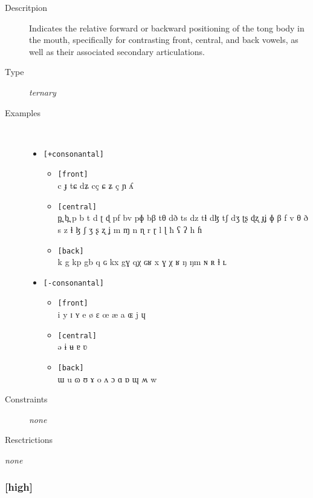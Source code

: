 \documentclass[10pt,letterpaper]{article}
\begin{document}
\begin{description}
\item[Descritpion] Indicates the relative forward or backward positioning of the tong body in the mouth, specifically for contrasting front, central, and back vowels, as well as their associated secondary articulations.
\item[Type] \emph{ternary}
\item[Examples]\
  \begin{itemize}
    \item \texttt{[+consonantal]}
    \begin{itemize}
      \item \texttt{[front]}\\
      c ɟ tɕ dʑ cç ɕ ʑ ç ɲ ʎ 
      \item \texttt{[central]}\\
      p̪ b̪ p b t d ʈ ɖ pf bv pɸ bβ tθ dð ts dz tɬ dɮ tʃ dʒ ʈʂ ɖʐ ɟʝ ɸ β f v θ ð s z ɬ ɮ ʃ ʒ ʂ ʐ ʝ m ɱ n ɳ r ɽ l ɭ ħ ʕ ʔ h ɦ 
      \item \texttt{[back]}\\
      k g kp gb q ɢ kx gɣ qχ ɢʁ x ɣ χ ʁ ŋ ŋm ɴ ʀ ɫ ʟ 
    \end{itemize}
    \item  \texttt{[-consonantal]}
    \begin{itemize}
      \item \texttt{[front]}\\
      i y ɪ ʏ e ø ɛ œ æ a ɶ j ɥ 
      \item \texttt{[central]}\\
      ə ɨ ʉ ɐ ʋ 
      \item \texttt{[back]}\\
      ɯ u ɷ ʊ ɤ o ʌ ɔ ɑ ɒ ɰ ʍ w 
    \end{itemize}
  \end{itemize}
\item[Constraints] \emph{none}
\item[Resctrictions]
\end{description} \emph{none}

\subsubsection{[high]}
\label{ssub:feature_high}
\end{document}

